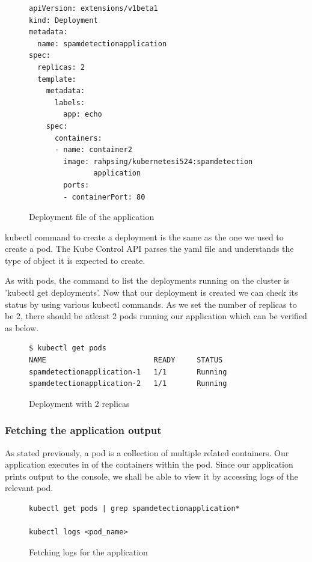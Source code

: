 \documentclass[9pt,twocolumn,twoside]{../../styles/osajnl}
\begin{document}
{\begin{figure}
\begin{verbatim}
apiVersion: extensions/v1beta1
kind: Deployment
metadata:
  name: spamdetectionapplication
spec:
  replicas: 2
  template:
    metadata:
      labels:
        app: echo
    spec:
      containers:
      - name: container2
        image: rahpsing/kubernetesi524:spamdetection
               application
        ports:
        - containerPort: 80
\end{verbatim}
\caption{Deployment file of the application}
\vspace{-3mm}
\label{Deployment file of the application}
\end{figure}

\noindent
kubectl command to create a deployment is the same as the one we used
to create a pod. The Kube Control API parses the yaml file and
understands the type of object it is expected to create.

\noindent
As with pods, the command to list the deployments running on the
cluster is 'kubectl get deployments'. Now that our deployment is
created we can check its status by using various kubectl commands. As
we set the number of replicas to be 2, there should be atleast 2 pods
running our application which can be verified as below.

\begin{figure}[H]
\begin{verbatim}
$ kubectl get pods
NAME                         READY     STATUS        
spamdetectionapplication-1   1/1       Running  
spamdetectionapplication-2   1/1       Running
\end{verbatim}
\caption{Deployment with 2 replicas}
\label{Deployment with 2 replicas}
\end{figure}

\subsubsection{Fetching the application output}
As stated previously, a pod is a collection of multiple related
containers. Our application executes in of the containers within the
pod. Since our application prints output to the console, we shall be
able to view it by accessing logs of the relevant pod.

\begin{figure}[H]
\begin{verbatim}
kubectl get pods | grep spamdetectionapplication*

kubectl logs <pod_name>
\end{verbatim}
\caption{Fetching logs for the application}
\vspace{-4mm}
\label{Fetching logs for the application}
\end{figure}

}
\end{document}
